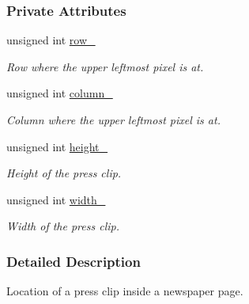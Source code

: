 \subsubsection*{Private Attributes}
\begin{CompactItemize}
\item 
\hypertarget{class_clip_location_1b2df7d88f1e70c6092704f0a5844d39}{
unsigned int \hyperlink{class_clip_location_1b2df7d88f1e70c6092704f0a5844d39}{row\_\-}}
\label{class_clip_location_1b2df7d88f1e70c6092704f0a5844d39}

\begin{CompactList}\small\item\em Row where the upper leftmost pixel is at. \item\end{CompactList}\item 
\hypertarget{class_clip_location_333e41e770e4cc18938b639a9072c138}{
unsigned int \hyperlink{class_clip_location_333e41e770e4cc18938b639a9072c138}{column\_\-}}
\label{class_clip_location_333e41e770e4cc18938b639a9072c138}

\begin{CompactList}\small\item\em Column where the upper leftmost pixel is at. \item\end{CompactList}\item 
\hypertarget{class_clip_location_bf304a78eade46f1b5c6cfcf42e15643}{
unsigned int \hyperlink{class_clip_location_bf304a78eade46f1b5c6cfcf42e15643}{height\_\-}}
\label{class_clip_location_bf304a78eade46f1b5c6cfcf42e15643}

\begin{CompactList}\small\item\em Height of the press clip. \item\end{CompactList}\item 
\hypertarget{class_clip_location_e39508c504ce7807d730e58c0270d2f9}{
unsigned int \hyperlink{class_clip_location_e39508c504ce7807d730e58c0270d2f9}{width\_\-}}
\label{class_clip_location_e39508c504ce7807d730e58c0270d2f9}

\begin{CompactList}\small\item\em Width of the press clip. \item\end{CompactList}\end{CompactItemize}


\subsubsection{Detailed Description}
Location of a press clip inside a newspaper page. 

